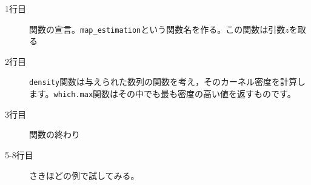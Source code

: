 \begin{description}
	\item[1行目] 関数の宣言。\verb|map_estimation|という関数名を作る。この関数は引数$z$を取る
	\item[2行目] \texttt{density}関数は与えられた数列の関数を考え，そのカーネル密度を計算します。\texttt{which.max}関数はその中でも最も密度の高い値を返すものです。
	\item[3行目] 関数の終わり
	\item[5-8行目] さきほどの例で試してみる。
\end{description}
